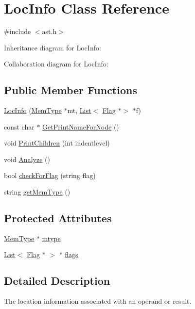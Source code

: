 \hypertarget{class_loc_info}{}\section{Loc\+Info Class Reference}
\label{class_loc_info}


{\ttfamily \#include $<$ast.\+h$>$}



Inheritance diagram for Loc\+Info\+:


Collaboration diagram for Loc\+Info\+:
\subsection*{Public Member Functions}
\begin{DoxyCompactItemize}
\item 
\hyperlink{class_loc_info_a871ae68c7b70efe62dc2baaa0f588b0a}{Loc\+Info} (\hyperlink{class_mem_type}{Mem\+Type} $\ast$mt, \hyperlink{class_list}{List}$<$ \hyperlink{class_flag}{Flag} $\ast$$>$ $\ast$f)
\item 
const char $\ast$ \hyperlink{class_loc_info_a06b3afd2c766a45dbfe9d4e606845e39}{Get\+Print\+Name\+For\+Node} ()
\item 
void \hyperlink{class_loc_info_ade64091d3ca7267ae2b32307c97426dc}{Print\+Children} (int indentlevel)
\item 
void \hyperlink{class_loc_info_a129d70c92d57a7ab130b699ee8052ef4}{Analyze} ()
\item 
bool \hyperlink{class_loc_info_a3ff1c09b9f5a2e417c39e03168dfd639}{check\+For\+Flag} (string flag)
\item 
string \hyperlink{class_loc_info_ae4dcb587c75774e4952af629003076bd}{get\+Mem\+Type} ()
\end{DoxyCompactItemize}
\subsection*{Protected Attributes}
\begin{DoxyCompactItemize}
\item 
\hyperlink{class_mem_type}{Mem\+Type} $\ast$ \hyperlink{class_loc_info_a05a5b4ddedff7bbcc41c04f093711987}{mtype}
\item 
\hyperlink{class_list}{List}$<$ \hyperlink{class_flag}{Flag} $\ast$ $>$ $\ast$ \hyperlink{class_loc_info_a4732d45b7e41e9ecd36d1db6ded5bad6}{flags}
\end{DoxyCompactItemize}


\subsection{Detailed Description}
The location information associated with an operand or result. 

